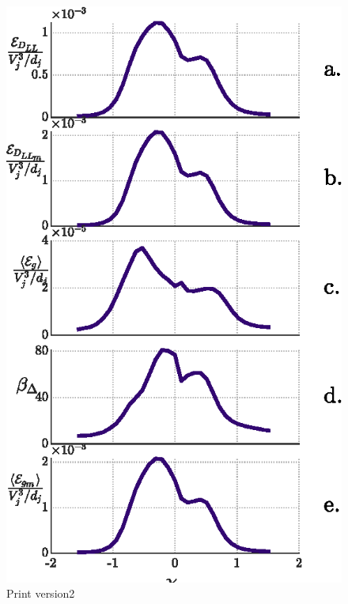 \documentclass{article}
\begin{document}
\begin{figure}
    \centering
    \includegraphics{figs/PG_4Hz_Diss_Splots_3p.eps}
    \caption{Print version2}
    \label{dissplots3}
\end{figure}
\end{document}
